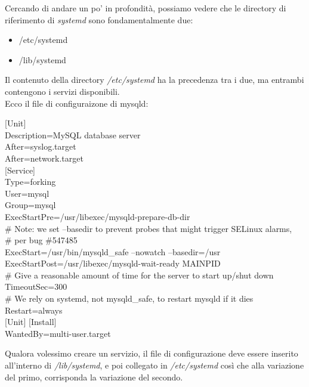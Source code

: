Cercando di andare un po' in profondità, possiamo vedere che le directory di riferimento di {\itshape systemd} sono fondamentalmente due:
\begin{itemize}
\item /etc/systemd
\item /lib/systemd 
\end{itemize}

Il contenuto della directory {\itshape /etc/systemd} ha la precedenza tra i due, ma entrambi contengono i servizi disponibili.\\

Ecco il file di configuraizone di mysqld:
\begin{shaded}
{\color[cmyk]{0, 0, 0, 0}[Unit]\\
Description=MySQL database server\\
After=syslog.target\\
After=network.target\\

[Service]\\
Type=forking\\
User=mysql\\
Group=mysql\\

ExecStartPre=/usr/libexec/mysqld-prepare-db-dir\\
\# Note: we set --basedir to prevent probes that might trigger SELinux alarms,\\
\# per bug \#547485\\
ExecStart=/usr/bin/mysqld\_safe --nowatch --basedir=/usr\\
ExecStartPost=/usr/libexec/mysqld-wait-ready \textdollar MAINPID\\

\# Give a reasonable amount of time for the server to start up/shut down\\
TimeoutSec=300\\

\# We rely on systemd, not mysqld\_safe, to restart mysqld if it dies\\
Restart=always\\
{\color[cmyk]{0, 0, 0, 0}[Unit]
[Install]\\
WantedBy=multi-user.target\\
}
}
\end{shaded}

Qualora volessimo creare un servizio, il file di configurazione deve essere inserito all'interno di {\itshape /lib/systemd}, e poi collegato in {\itshape /etc/systemd} così che alla variazione del primo, corrisponda la variazione del secondo.\\

